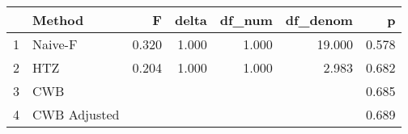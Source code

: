 \begin{table}[ht]
\centering
\begin{tabular}{rlrrrrr}
  \hline
 & Method & F & delta & df\_num & df\_denom & p \\ 
  \hline
1 & Naive-F & 0.320 & 1.000 & 1.000 & 19.000 & 0.578 \\ 
  2 & HTZ & 0.204 & 1.000 & 1.000 & 2.983 & 0.682 \\ 
  3 & CWB &  &  &  &  & 0.685 \\ 
  4 & CWB Adjusted &  &  &  &  & 0.689 \\ 
   \hline
\end{tabular}
\end{table}
